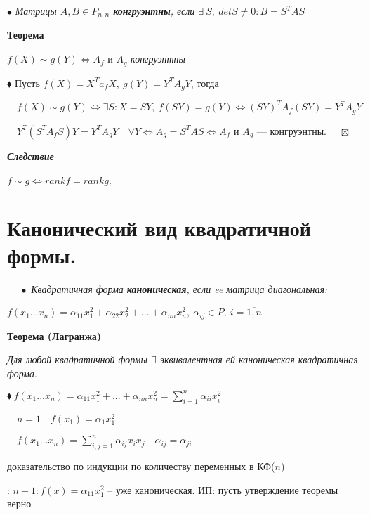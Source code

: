 \documentclass[a4paper, 12pt]{report}
\begin{document}
	$\bullet$ \textit{Матрицы $A, B \in P_{n,n}$ \textbf{конгруэнтны}, если $\exists\ S,\ detS \ne 0: B = S^T A S$}
	\par\bigskip
	\textbf{Теорема}
	
	$f(X) \sim g(Y) \Longleftrightarrow A_f$ и $A_g$ \textit{конгруэнтны}
	\par\bigskip
	$\blacklozenge$ Пусть $f(X) = X^T a_f X,\ g(Y) = Y^T A_g Y$, тогда
	\par
	$\quad f(X) \sim g(Y) \Longleftrightarrow \exists S: X = SY,\ f(SY) = g(Y) \Longleftrightarrow (SY)^T A_f (SY) = Y^T A_g Y $
	\par
	$\quad Y^T(S^T A_f S) Y = Y^T A_g Y \quad \forall Y\Longleftrightarrow A_g = S^T A S \Longleftrightarrow A_f$ и $A_g$ --- конгруэнтны. $\quad \boxtimes$
	\par\bigskip
	\textit{\textbf{Следствие}}
	
	\textit{$f\sim g \Longleftrightarrow rank f = rank g$}.
	
	
	
	
	
	
	
	
	\section{Канонический вид квадратичной формы.}
	
	$\quad \;\bullet$ \textit{Квадратичная форма \textbf{\textit{каноническая}}, если ee матрица диагональная:}
	\par\bigskip
	$f(x_1...x_n) = \alpha_{11}x_1^2 + \alpha_{22}x_2^2 + ... + \alpha_{nn}x_n^2,\ \alpha_{ij} \in P,\ i = \overline{1,n}$
	\par\bigskip
	\textbf{Теорема (Лагранжа)}
	\par
	\textit{Для любой квадратичной формы $\exists$ эквивалентная ей каноническая квадратичная форма}.
	\par\bigskip
	$\blacklozenge\ f(x_1...x_n) = \alpha_{11}x_1^2 + ... + \alpha_{nn}x_n^2 = \sum\limits_{i=1}^n \alpha_{ii} x_i^2$
	
	$\quad n = 1 \quad f(x_1) = \alpha_1 x_1^2$
	
	$\quad f(x_1...x_n) = \sum\limits_{i,j=1}^n \alpha_{ij} x_i x_j \quad \alpha_{ij} = \alpha_{ji}$
	\par\bigskip
	 доказательство по индукции по количеству переменных в КФ($n$)
	\par\bigskip {}: $n - 1: f(x) = \alpha_{11}x_1^2$ – уже каноническая.
	ИП: пусть утверждение теоремы верно 
	
\end{document}
